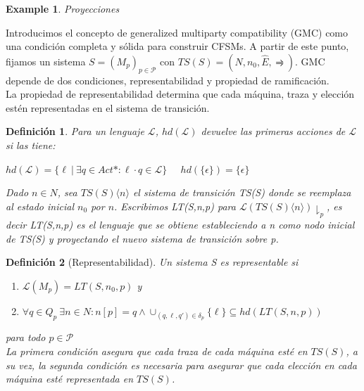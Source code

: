 \documentclass[paper=a4, fontsize=11pt, spanish]{scrartcl} %
\numberwithin{equation}{section} %
\numberwithin{figure}{section} %
\numberwithin{table}{section} %
\newtheorem{example}{Example}
\newtheorem{definition}{Definición}
\begin{document}
\begin{example}{Proyecciones}


\end{example}

Introducimos el concepto de generalized multiparty compatibility (GMC) como una condición completa y sólida para construir CFSMs. 
A partir de este punto, fijamos un sistema $S =(M_p)_{p \in \mathcal{P}} $ con $TS(S)= (N, n_0, \hat{E}, \rightrightharpoons)$. GMC depende de dos condiciones, representabilidad y propiedad de ramificación.\\

La propiedad de representabilidad determina que cada máquina, traza y elección estén representadas en el sistema de transición.

\begin{definition}Para un lenguaje $\mathcal{L}$, $hd(\mathcal{L})$ devuelve las primeras acciones de $\mathcal{L}$ si las tiene: 
\begin{center}
$hd(\mathcal{L})= \{\ell \ | \ \exists q \in Act*: \ell \cdot q \in \mathcal{L} \}$	\ \	 $hd(\{ \epsilon \}) = \{ \epsilon \}$
\end{center}
Dado $n \in N$, sea $ TS(S)\langle n \rangle$ el sistema de transición TS(S) donde se reemplaza al estado inicial $n_0$ por $n$. Escribimos LT(S,n,p) para $\mathcal{L}(TS(S)\langle n \rangle)\downharpoonright_p $, es decir LT(S,n,p) es el lenguaje que se obtiene estableciendo a n como nodo inicial de TS(S) y proyectando el nuevo sistema de transición sobre p.
\end{definition}

\begin{definition}[Representabilidad]Un sistema S es representable si
\begin{enumerate}
\item $\mathcal{L}(M_p) = LT(S,n_0,p) $ y
\item $\forall q \in Q_p \ \exists n \in N: n[p] = q \land  \cup_{(q,\ell, q') \in \delta_p} \{ \ell \} \subseteq hd (LT(S,n,p))$
\end{enumerate}
para todo $p \in \mathcal{P} $ \\

La primera condición asegura que cada traza de cada máquina esté en $TS(S)$, a su vez, la segunda condición es necesaria para asegurar que cada elección en cada máquina esté representada en $TS(S)$.
\end{definition}
\end{document}
